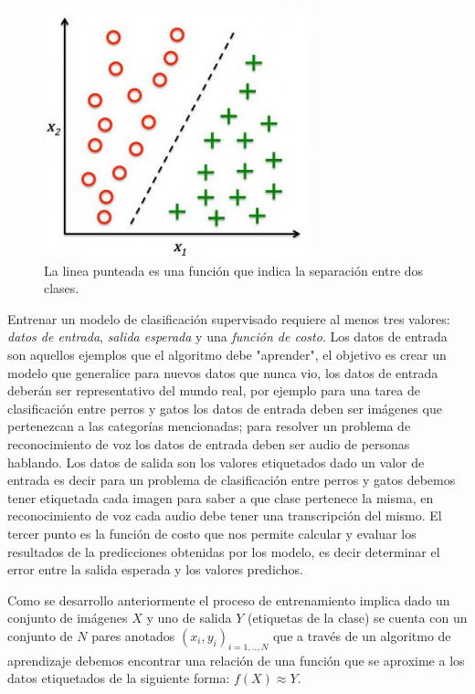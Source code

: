 \begin{figure}[H] \centering
  \includegraphics[scale=0.4,keepaspectratio=true,clip=true]{imagenes/MarcoTeorico/classification.jpg}
  \caption{La linea punteada es una función que indica la separación entre dos clases.}\label{Fig:clasificacion}
\end{figure}

Entrenar un modelo de clasificación supervisado requiere al menos tres valores:  \textit{datos de entrada}, \textit{salida esperada} y una \textit{función de costo}.  Los datos de entrada son aquellos ejemplos que el algoritmo debe "aprender", el objetivo es crear un modelo que generalice para nuevos datos que nunca vio, los datos de entrada deberán ser representativo del mundo real, por ejemplo para una tarea de clasificación entre perros y gatos los datos de entrada deben ser imágenes que pertenezcan a las categorías mencionadas; para resolver un problema de reconocimiento de voz los datos de entrada deben ser audio de personas hablando. Los datos de salida son los valores etiquetados dado un valor de entrada es decir para un problema de clasificación entre perros y gatos debemos tener etiquetada cada imagen para saber a que clase pertenece la misma, en reconocimiento de voz cada audio debe tener una transcripción del mismo. El tercer punto es la función de costo que nos permite calcular y evaluar  los resultados de la predicciones obtenidas por los modelo, es decir determinar el error entre la salida esperada y los valores predichos.

Como se desarrollo anteriormente el proceso de entrenamiento implica dado un conjunto de imágenes $X$ y uno de salida $Y$ (etiquetas de la clase) se cuenta con un conjunto de $N$ pares anotados ${(x_i, y_i)}_{i=1,..,N}$  que a través de un algoritmo de aprendizaje debemos encontrar una relación de una función que se aproxime a los datos etiquetados de la siguiente forma: $f(X) ≈ Y$.



